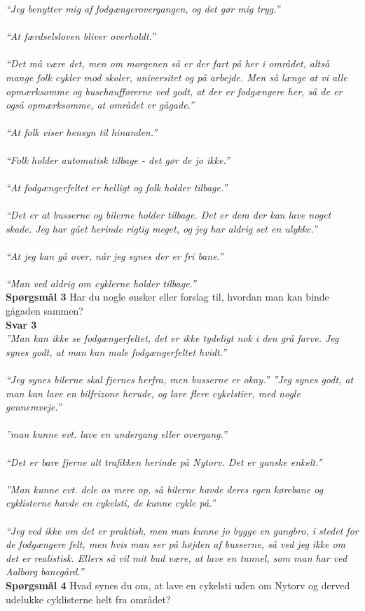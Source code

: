   \emph{“Jeg benytter mig af fodgængerovergangen, og det gør mig tryg.”}
~\\\\
  \emph{“At færdselsloven bliver overholdt.”}
~\\\\
  \emph{“Det må være det, men om morgenen så er der fart på her i området, altså mange folk cykler mod skoler, universitet og på arbejde. Men så længe at vi alle opmærksomme og buschaufførerne ved godt, at der er fodgængere her, så de er også opmærksomme, at området er gågade.”}
~\\\\
  \emph{“At folk viser hensyn til hinanden.”}
~\\\\
  \emph{“Folk holder automatisk tilbage - det gør de jo ikke.”}
~\\\\
  \emph{“At fodgængerfeltet er helligt og folk holder tilbage.”}
~\\\\
  \emph{“Det er at busserne og bilerne holder tilbage. Det er dem der kan lave noget skade. Jeg har gået herinde rigtig meget, og jeg har aldrig set en ulykke.”}
~\\\\
  \emph{“At jeg kan gå over, når jeg synes der er fri bane.”}
~\\\\
  \emph{“Man ved aldrig om cyklerne holder tilbage.”}
  ~\\
  \textbf{Spørgsmål 3}
  Har du nogle ønsker eller forslag til, hvordan man kan binde gågaden sammen?
~\\
  \textbf{Svar 3} ~\\
  \emph{”Man kan ikke se fodgængerfeltet, det er ikke tydeligt nok i den grå farve. Jeg synes godt, at man kan male fodgængerfeltet hvidt.”}
~\\\\
\emph{“Jeg synes bilerne skal fjernes herfra, men busserne er okay.”
  ”Jeg synes godt, at man kan lave en bilfrizone herude, og lave flere cykelstier, med nogle gennemveje.”}
~\\\\

  \emph{”man kunne evt. lave en undergang eller overgang.”}
~\\\\
  \emph{“Det er bare fjerne alt trafikken herinde på Nytorv. Det er ganske enkelt.”}
~\\\\
  \emph{”Man kunne evt. dele os mere op, så bilerne havde deres egen kørebane og cyklisterne havde en cykelsti, de kunne cykle på.”}
~\\\\
  \emph{“Jeg ved ikke om det er praktisk, men man kunne jo bygge en gangbro, i stedet for de fodgængere felt, men hvis man ser på højden af busserne, så ved jeg ikke om det er realistisk. Ellers så vil mit bud være, at lave en tunnel, som man har ved Aalborg banegård.”}
~\\
\textbf{Spørgsmål 4}
Hvad synes du om, at lave en cykelsti uden om Nytorv og derved udelukke cyklisterne helt fra området?

